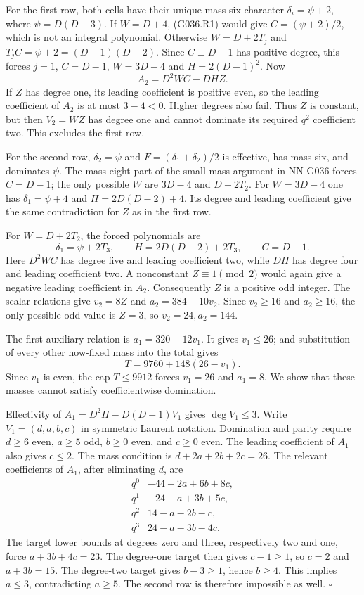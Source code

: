 For the first row, both cells have their unique
mass-six character $\delta_i=\psi+2$, where
$\psi=D(D-3)$. If $W=D+4$, (G036.R1) would give
$C=(\psi+2)/2$, which is not an integral polynomial.
Otherwise $W=D+2T_j$ and
$T_jC=\psi+2=(D-1)(D-2)$.
Since $C\equiv D-1$ has positive degree, this forces
$j=1$, $C=D-1$, $W=3D-4$ and $H=2(D-1)^2$.
Now
\[
                 A_2=D^2WC-DHZ.
\]
If $Z$ has degree one, its leading coefficient is
positive even, so the leading coefficient of $A_2$
is at most $3-4<0$. Higher degrees also fail.
Thus $Z$ is constant, but then $V_2=WZ$ has degree
one and cannot dominate its required $q^2$ coefficient
two. This excludes the first row.

For the second row, $\delta_2=\psi$ and
$F=(\delta_1+\delta_2)/2$ is effective, has mass six,
and dominates $\psi$. The mass-eight part of the
small-mass argument in NN-G036 forces $C=D-1$;
the only possible $W$ are $3D-4$ and $D+2T_2$.
For $W=3D-4$ one has $\delta_1=\psi+4$ and
$H=2D(D-2)+4$. Its degree and leading coefficient
give the same contradiction for $Z$ as in the first row.

For $W=D+2T_2$, the forced polynomials are
\[
 \delta_1=\psi+2T_3,\qquad
 H=2D(D-2)+2T_3,\qquad C=D-1.
\]
Here $D^2WC$ has degree five and leading coefficient
two, while $DH$ has degree four and leading coefficient
two. A nonconstant $Z\equiv1\pmod2$ would again give
a negative leading coefficient in $A_2$.
Consequently $Z$ is a positive odd integer.
The scalar relations give $v_2=8Z$ and
$a_2=384-10v_2$. Since $v_2\ge16$ and $a_2\ge16$,
the only possible odd value is $Z=3$, so
$v_2=24,a_2=144$.

The first auxiliary relation is $a_1=320-12v_1$.
It gives $v_1\le26$; and substitution of every other
now-fixed mass into the total gives
\[
                    T=9760+148(26-v_1).
\]
Since $v_1$ is even, the cap $T\le9912$ forces
$v_1=26$ and $a_1=8$.
We show that these masses cannot satisfy coefficientwise
domination.

Effectivity of $A_1=D^2H-D(D-1)V_1$ gives
$\deg V_1\le3$. Write $V_1=(d,a,b,c)$ in symmetric
Laurent notation. Domination and parity require
$d\ge6$ even, $a\ge5$ odd, $b\ge0$ even, and
$c\ge0$ even. The leading coefficient of $A_1$
also gives $c\le2$.
The mass condition is $d+2a+2b+2c=26$.
The relevant coefficients of $A_1$, after eliminating
$d$, are
\[
 \begin{array}{c|l}
 q^0&-44+2a+6b+8c,\\
 q^1&-24+a+3b+5c,\\
 q^2&14-a-2b-c,\\
 q^3&24-a-3b-4c.
 \end{array}
\]
The target lower bounds at degrees zero and three,
respectively two and one, force
$a+3b+4c=23$. The degree-one target then gives
$c-1\ge1$, so $c=2$ and $a+3b=15$.
The degree-two target gives $b-3\ge1$, hence $b\ge4$.
This implies $a\le3$, contradicting $a\ge5$.
The second row is therefore impossible as well.
\hfill$\square$

